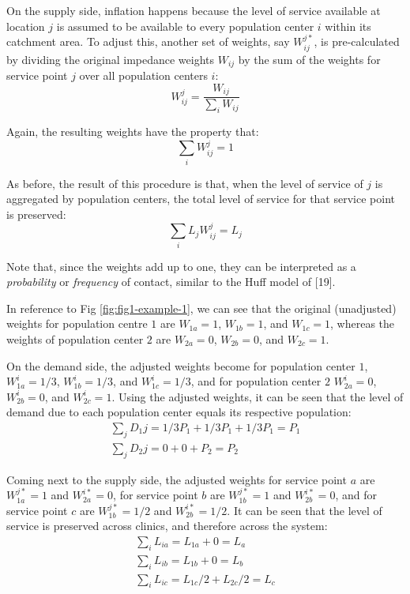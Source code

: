 \documentclass[10pt,letterpaper]{article}
\begin{document}
On the supply side, inflation happens because the level of service
available at location \(j\) is assumed to be available to every
population center \(i\) within its catchment area. To adjust this,
another set of weights, say \(W^{j*}_{ij}\), is pre-calculated by
dividing the original impedance weights \(W_{ij}\) by the sum of the
weights for service point \(j\) over all population centers \(i\): \[
W_{ij}^{j} = \frac{W_{ij}}{\sum_i W_{ij}}
\]

Again, the resulting weights have the property that: \[
\sum_iW_{ij}^{j}=1
\]

As before, the result of this procedure is that, when the level of
service of \(j\) is aggregated by population centers, the total level of
service for that service point is preserved: \[
\sum_i L_jW_{ij}^{j} = L_j 
\]

Note that, since the weights add up to one, they can be interpreted as a
\emph{probability} or \emph{frequency} of contact, similar to the Huff
model of {[}19{]}.

In reference to Fig \ref{fig:fig1-example-1}, we can see that the
original (unadjusted) weights for population centre \(1\) are
\(W_{1a} = 1\), \(W_{1b} = 1\), and \(W_{1c} = 1\), whereas the weights
of population center \(2\) are \(W_{2a} = 0\), \(W_{2b} = 0\), and
\(W_{2c} = 1\).

On the demand side, the adjusted weights become for population center
\(1\), \(W^{i}_{1a} = 1/3\), \(W^{i}_{1b} = 1/3\), and
\(W^{i}_{1c} = 1/3\), and for population center \(2\)
\(W^{i}_{2a} = 0\), \(W^{i}_{2b} = 0\), and \(W^{i}_{2c} = 1\). Using
the adjusted weights, it can be seen that the level of demand due to
each population center equals its respective population: \[
\begin{array}{ll}
            \sum_j D_1j = 1/3P_1 + 1/3P_1 + 1/3P_1 = P_1\\
            \sum_j D_2j = 0+0+P_2 = P_2
        \end{array}
\]

Coming next to the supply side, the adjusted weights for service point
\(a\) are \(W^{j*}_{1a} = 1\) and \(W^{i*}_{2a} = 0\), for service point
\(b\) are \(W^{j*}_{1b} = 1\) and \(W^{i*}_{2b} = 0\), and for service
point \(c\) are \(W^{j*}_{1b} = 1/2\) and \(W^{i*}_{2b} = 1/2\). It can
be seen that the level of service is preserved across clinics, and
therefore across the system: \[
\begin{array}{ll}
            \sum_i L_{ia} = L_{1a} + 0 = L_a\\
            \sum_i L_{ib} = L_{1b} + 0 = L_b\\
            \sum_i L_{ic} = L_{1c}/2 + L_{2c}/2 = L_c
        \end{array}
\]
\end{document}
